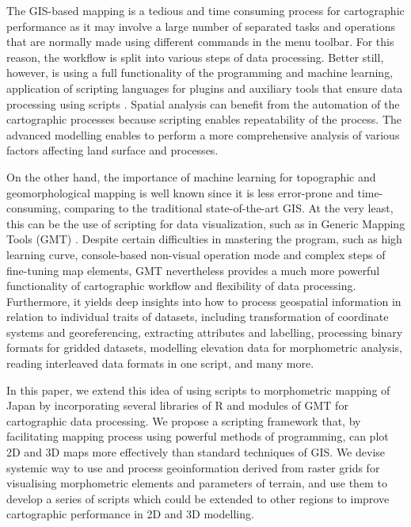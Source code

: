 \documentclass[land,article,submit,pdftex,moreauthors]{Definitions/mdpi}
\begin{document}
The GIS-based mapping is a tedious and time consuming process for cartographic performance as it may involve a large number of separated tasks and operations that are normally made using different commands in the menu toolbar. For this reason, the workflow is split into various steps of data processing. Better still, however, is using a full functionality of the programming and machine learning, application of scripting languages for plugins and auxiliary tools that ensure data processing using scripts \cite{NAGHIBI2021101232}. Spatial analysis can benefit from the automation of the cartographic processes because scripting enables repeatability of the process. The advanced modelling enables to perform a more comprehensive analysis of various factors affecting land surface and processes. 

On the other hand, the importance of machine learning for topographic and geomorphological mapping is well known since it is less error-prone and time-consuming, comparing to the traditional state-of-the-art GIS. At the very least, this can be the use of scripting for data visualization, such as in Generic Mapping Tools (GMT) \cite{FARAG2022229297,data7060074}. Despite certain difficulties in mastering the program, such as high learning curve, console-based non-visual operation mode and complex steps of fine-tuning map elements, GMT nevertheless provides a much more powerful functionality of cartographic workflow and flexibility of data processing. Furthermore, it yields deep insights into how to process geospatial information in relation to individual traits of datasets, including transformation of coordinate systems and georeferencing, extracting attributes and labelling, processing binary formats for gridded datasets, modelling elevation data for morphometric analysis, reading interleaved data formats in one script, and many more.

In this paper, we extend this idea of using scripts to morphometric mapping of Japan by incorporating several libraries of R and modules of GMT for cartographic data processing. We propose a scripting framework that, by facilitating mapping process using powerful methods of programming, can plot 2D and 3D maps more effectively than standard techniques of GIS. We devise systemic way to use and process geoinformation derived from raster grids for visualising morphometric elements and parameters of terrain, and use them to develop a series of scripts which could be extended to other regions to improve cartographic performance in 2D and 3D modelling.
\end{document}
